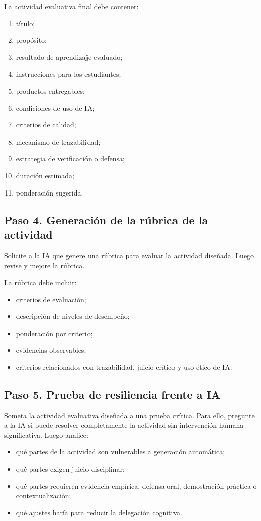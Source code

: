 \documentclass[12pt,letterpaper]{article}
\begin{document}
La actividad evaluativa final debe contener:

\begin{enumerate}
  \item título;
  \item propósito;
  \item resultado de aprendizaje evaluado;
  \item instrucciones para los estudiantes;
  \item productos entregables;
  \item condiciones de uso de IA;
  \item criterios de calidad;
  \item mecanismo de trazabilidad;
  \item estrategia de verificación o defensa;
  \item duración estimada;
  \item ponderación sugerida.
\end{enumerate}

\subsection*{Paso 4. Generación de la rúbrica de la actividad}

Solicite a la IA que genere una rúbrica para evaluar la actividad
diseñada. Luego revise y mejore la rúbrica.

La rúbrica debe incluir:

\begin{itemize}
  \item criterios de evaluación;
  \item descripción de niveles de desempeño;
  \item ponderación por criterio;
  \item evidencias observables;
  \item criterios relacionados con trazabilidad, juicio crítico y uso
    ético de IA.
\end{itemize}

\subsection*{Paso 5. Prueba de resiliencia frente a IA}

Someta la actividad evaluativa diseñada a una prueba crítica. Para
ello, pregunte a la IA si puede resolver completamente la actividad
sin intervención humana significativa. Luego analice:

\begin{itemize}
  \item qué partes de la actividad son vulnerables a generación automática;
  \item qué partes exigen juicio disciplinar;
  \item qué partes requieren evidencia empírica, defensa oral,
    demostración práctica o contextualización;
  \item qué ajustes haría para reducir la delegación cognitiva.
\end{itemize}
\end{document}
